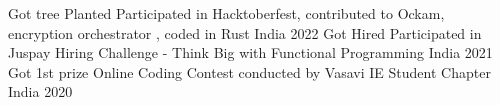 


\begin{cvhonors}

   \cvhonor
    {Got tree Planted} %
    {Participated in Hacktoberfest, contributed to Ockam, encryption orchestrator , coded in Rust} %
    {India} %
    {2022} %
  \cvhonor
    {Got Hired} %
    {Participated in Juspay Hiring Challenge - Think Big with Functional Programming} %
    {India} %
    {2021} %
\cvhonor
    {Got 1st prize} %
    {Online Coding Contest conducted by Vasavi IE Student Chapter} %
    {India} %
    {2020} %
\end{cvhonors}